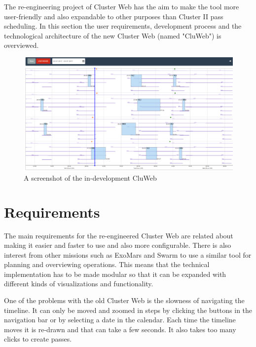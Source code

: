 
The re-engineering project of Cluster Web has the aim to make the tool more user-friendly and also expandable to other purposes than Cluster II pass scheduling. In this section the user requirements, development process and the technological architecture of the new Cluster Web (named "CluWeb") is overviewed.

\begin{figure}[ht]
  \begin{center}
    \includegraphics*[width=1\textwidth]{cluweb_dev}
  \end{center}
  \caption{A screenshot of the in-development CluWeb}
  \label{fig:cluweb}
\end{figure}

\section{Requirements}
    The main requirements for the re-engineered Cluster Web are related about making it easier and faster to use and also more configurable. There is also interest from other missions such as ExoMars and Swarm to use a similar tool for planning and overviewing operations. This means that the technical implementation has to be made modular so that it can be expanded with different kinds of visualizations and functionality.

One of the problems with the old Cluster Web is the slowness of navigating the timeline. It can only be moved and zoomed in steps by clicking the buttons in the navigation bar or by selecting a date in the calendar. Each time the timeline moves it is re-drawn and that can take a few seconds. It also takes too many clicks to create passes.

